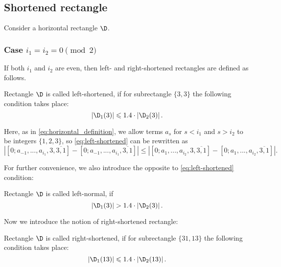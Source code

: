 \subsection{Shortened rectangle}
\label{sbsc:shortened}

Consider a horizontal rectangle $\D$.


\subsubsection{Case $i_1 = i_2 = 0 \pmod 2$}
\label{sbsbsc:shortened_even}

If both $i_1$ and $i_2$ are even, then left- and right-shortened rectangles are defined as follows.

\begin{definition}
	Rectangle $\D$ is called left-shortened,
	if for subrectangle $\{3, 3\}$ the following condition takes place:
	\begin{equation}
		\label{eq:left-shortened}
		\left| \D_1(3) \right| \leqslant 1.4 \cdot \left| \D_2(3) \right|.
	\end{equation}
\end{definition}

Here, as in \ref{eq:horizontal_definition},
we allow terms $a_s$ for $s < i_1$ and $s > i_2$ to be integers $\{1, 2, 3\}$,
so \ref{eq:left-shortened} can be rewritten as
%
\begin{equation*}
	\left|
		\left[ 0; a_{-1}, ..., a_{i_1}, 3, \overline{3, 1} \right] -
		\left[ 0; a_{-1}, ..., a_{i_1}, \overline{3, 1} \right]
	\right| \leqslant \left|
		\left[ 0; a_{1}, ..., a_{i_2}, 3, \overline{3, 1} \right] -
		\left[ 0; a_{1}, ..., a_{i_2}, \overline{3, 1} \right]
	\right|.
\end{equation*}

For further convenience, we also introduce the opposite to \ref{eq:left-shortened} condition:

\begin{definition}
	Rectangle $\D$ is called left-normal, if
	\begin{equation}
		\label{eq:left-normal}
		\left| \D_1(3) \right| > 1.4 \cdot \left| \D_2(3) \right|.
	\end{equation}
\end{definition}

Now we introduce the notion of right-shortened rectangle:

\begin{definition}
	Rectangle $\D$ is called right-shortened,
	if for subrectangle $\{31, 13\}$ the following condition takes place:
	\begin{equation}
		\label{eq:right-shortened}
		\left| \D_1(13) \right| \leqslant 1.4 \cdot \left| \D_2(13) \right|.
	\end{equation}
\end{definition}

